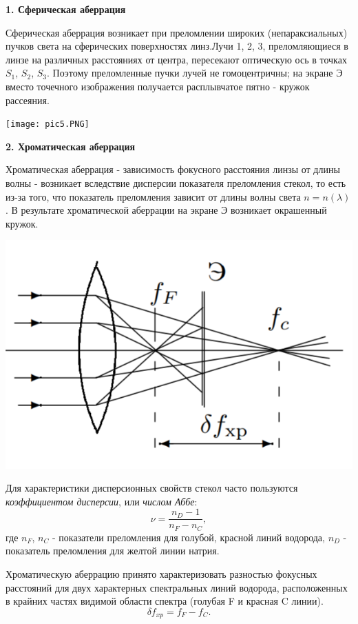 \documentclass[a4paper,12pt]{report}
\begin{document}
\noindent\textbf{1. Сферическая аберрация}

Сферическая аберрация возникает при преломлении широких (непараксиальных) пучков света на сферических поверхностях линз.Лучи 1, 2, 3, преломляющиеся в линзе на различных расстояниях от центра, пересекают оптическую ось в точках $S_{1}$, $S_{2}$, $S_{3}$. Поэтому преломленные пучки лучей не гомоцентричны; на экране Э вместо точечного изображения получается расплывчатое пятно - кружок рассеяния.
\begin{center}
    \texttt{[image: pic5.PNG]}
\end{center}

\noindent\textbf{2. Хроматическая аберрация}

Хроматическая аберрация - зависимость фокусного расстояния линзы от длины волны - возникает вследствие дисперсии показателя преломления стекол, то есть из-за того, что показатель преломления зависит от длины волны света $n = n(\lambda)$. В результате хроматической аберрации на экране Э возникает окрашенный кружок.
\begin{center}
    \includegraphics[scale = 0.5]{pic6.PNG}
\end{center}
Для характеристики дисперсионных свойств стекол часто пользуются \textit{коэффициентом дисперсии}, или \textit{числом Аббе}:
\begin{equation}
    \nu = \frac{n_{D}-1}{n_{F}-n_{C}},
\end{equation}
где $n_{F}$, $n_{C}$ - показатели преломления для голубой, красной линий водорода, $n_{D}$ - показатель преломления для желтой линии натрия.

Хроматическую аберрацию принято характеризовать разностью фокусных расстояний для двух характерных спектральных линий водорода, расположенных в крайних частях видимой области спектра (голубая F и красная C линии).
\begin{equation}
    \delta f_{xp} = f_{F}-f_{C}.
\end{equation}
\end{document}
